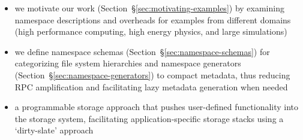\begin{itemize}
  \setlength\itemsep{-0.5em}

\item we motivate our work (Section~\S\ref{sec:motivating-examples}) by
examining namespace descriptions and overheads for examples from different
domains (high performance computing, high energy physics, and large
simulations)

\item we define namespace schemas (Section~\S\ref{sec:namespace-schemas}) for
categorizing file system hierarchies and namespace generators
(Section~\S\ref{sec:namespace-generators}) to compact metadata, thus reducing
RPC amplification and facilitating lazy metadata generation when needed

\item a programmable storage approach that pushes user-defined functionality
into the storage system, facilitating application-specific storage stacks using
a `dirty-slate' approach

\end{itemize}
